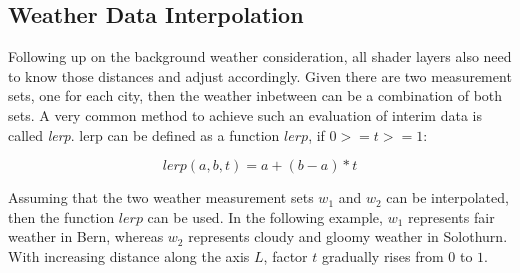 \pagebreak

\subsection{Weather Data Interpolation}
\label{section:impl:layerinterpolation}
Following up on the background weather consideration, all \gls{shader} layers also need to know those distances and adjust accordingly.
Given there are two measurement sets, one for each city, then the weather inbetween can be a combination of both sets.
A very common method to achieve such an evaluation of interim data is called \emph{\gls{lerp}}.
\Gls{lerp} can be defined as a function $lerp$, if $0 >= t >= 1$: 

$$lerp(a, b, t) = a + (b - a) * t$$

\noindent
Assuming that the two weather measurement sets $w_1$ and $w_2$ can be interpolated, then the function $lerp$ can be used.
In the following example, $w_1$ represents fair weather in Bern, whereas $w_2$ represents cloudy and gloomy weather in Solothurn.
With increasing distance along the axis \color{darkercyan}$L$\color{black}, factor $t$ gradually rises from $0$ to $1$.

\begin{figure}[H]
    \centering
    \label{img:tikz:shadersetup:lerp}       
\end{figure}

